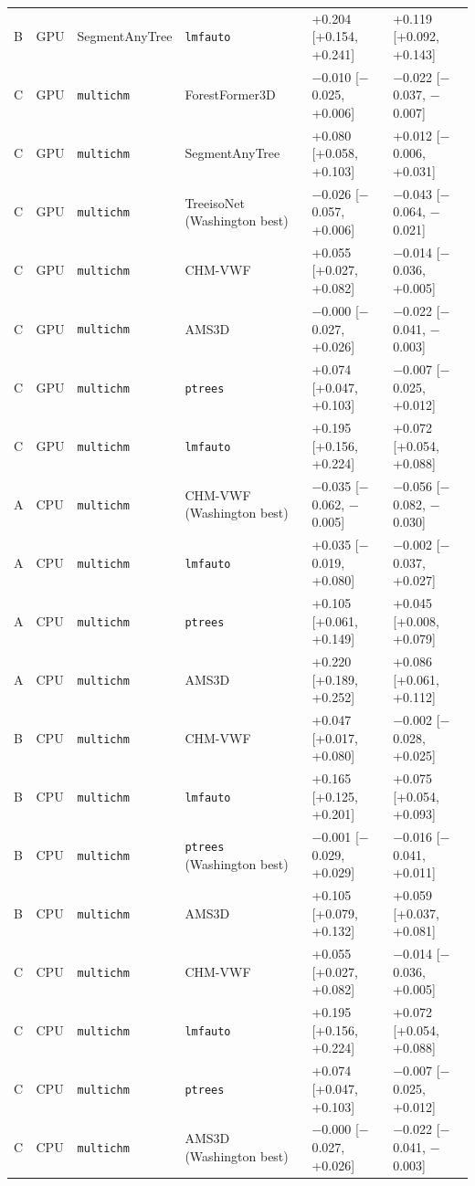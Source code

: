 \documentclass[10pt,a4paper]{article}
\begin{document}
{\begin{xltabular}{\textwidth}{lllLLL}
B & GPU & SegmentAnyTree & \texttt{lmfauto} & +0.204 [+0.154, +0.241] & +0.119 [+0.092, +0.143] \\
C & GPU & \texttt{multichm} & ForestFormer3D & $-$0.010 [$-$0.025, +0.006] & $-$0.022 [$-$0.037, $-$0.007] \\
C & GPU & \texttt{multichm} & SegmentAnyTree & +0.080 [+0.058, +0.103] & +0.012 [$-$0.006, +0.031] \\
C & GPU & \texttt{multichm} & TreeisoNet (Washington best) & $-$0.026 [$-$0.057, +0.006] & $-$0.043 [$-$0.064, $-$0.021] \\
C & GPU & \texttt{multichm} & CHM-VWF & +0.055 [+0.027, +0.082] & $-$0.014 [$-$0.036, +0.005] \\
C & GPU & \texttt{multichm} & AMS3D & $-$0.000 [$-$0.027, +0.026] & $-$0.022 [$-$0.041, $-$0.003] \\
C & GPU & \texttt{multichm} & \texttt{ptrees} & +0.074 [+0.047, +0.103] & $-$0.007 [$-$0.025, +0.012] \\
C & GPU & \texttt{multichm} & \texttt{lmfauto} & +0.195 [+0.156, +0.224] & +0.072 [+0.054, +0.088] \\
A & CPU & \texttt{multichm} & CHM-VWF (Washington best) & $-$0.035 [$-$0.062, $-$0.005] & $-$0.056 [$-$0.082, $-$0.030] \\
A & CPU & \texttt{multichm} & \texttt{lmfauto} & +0.035 [$-$0.019, +0.080] & $-$0.002 [$-$0.037, +0.027] \\
A & CPU & \texttt{multichm} & \texttt{ptrees} & +0.105 [+0.061, +0.149] & +0.045 [+0.008, +0.079] \\
A & CPU & \texttt{multichm} & AMS3D & +0.220 [+0.189, +0.252] & +0.086 [+0.061, +0.112] \\
B & CPU & \texttt{multichm} & CHM-VWF & +0.047 [+0.017, +0.080] & $-$0.002 [$-$0.028, +0.025] \\
B & CPU & \texttt{multichm} & \texttt{lmfauto} & +0.165 [+0.125, +0.201] & +0.075 [+0.054, +0.093] \\
B & CPU & \texttt{multichm} & \texttt{ptrees} (Washington best) & $-$0.001 [$-$0.029, +0.029] & $-$0.016 [$-$0.041, +0.011] \\
B & CPU & \texttt{multichm} & AMS3D & +0.105 [+0.079, +0.132] & +0.059 [+0.037, +0.081] \\
C & CPU & \texttt{multichm} & CHM-VWF & +0.055 [+0.027, +0.082] & $-$0.014 [$-$0.036, +0.005] \\
C & CPU & \texttt{multichm} & \texttt{lmfauto} & +0.195 [+0.156, +0.224] & +0.072 [+0.054, +0.088] \\
C & CPU & \texttt{multichm} & \texttt{ptrees} & +0.074 [+0.047, +0.103] & $-$0.007 [$-$0.025, +0.012] \\
C & CPU & \texttt{multichm} & AMS3D (Washington best) & $-$0.000 [$-$0.027, +0.026] & $-$0.022 [$-$0.041, $-$0.003] \\
\end{xltabular}
}
\end{document}

